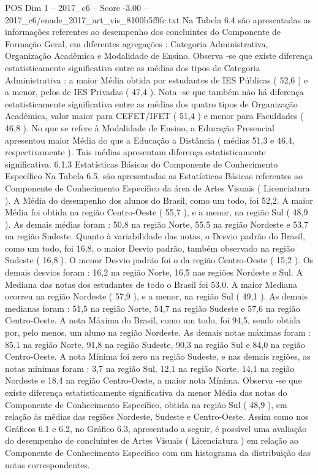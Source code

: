 \begin{textsample}{POS Dim 1 – 2017\_c6 – Score -3.00 – 2017\_c6/enade\_2017\_art\_vis\_8100b5f9fc.txt}
Na Tabela 6.4 são apresentadas as informações referentes ao desempenho dos concluintes do Componente de Formação Geral, em diferentes agregações : Categoria Administrativa, Organização Acadêmica e Modalidade de Ensino.
Observa -se que existe diferença estatisticamente significativa entre as médias dos tipos de Categoria Administrativa : a maior Média obtida por estudantes de IES Públicas ( 52,6 ) e a menor, pelos de IES Privadas ( 47,4 ).
Nota -se que também não há diferença estatisticamente significativa entre as médias dos quatro tipos de Organização Acadêmica, valor maior para CEFET/IFET ( 51,4 ) e menor para Faculdades ( 46,8 ).
No que se refere à Modalidade de Ensino, a Educação Presencial apresentou maior Média do que a Educação a Distância ( médias 51,3 e 46,4, respectivamente ).
Tais médias apresentam diferença estatisticamente significativa. 6.1.3 Estatísticas Básicas do Componente de Conhecimento Específico Na Tabela 6.5, são apresentadas as Estatísticas Básicas referentes ao Componente de Conhecimento Específico da área de Artes Visuais ( Licenciatura ).
A Média do desempenho dos alunos do Brasil, como um todo, foi 52,2.
A maior Média foi obtida na região Centro-Oeste ( 55,7 ), e a menor, na região Sul ( 48,9 ).
As demais médias foram : 50,8 na região Norte, 55,5 na região Nordeste e 53,7 na região Sudeste.
Quanto à variabilidade das notas, o Desvio padrão do Brasil, como um todo, foi 16,8, o maior Desvio padrão, também observado na região Sudeste ( 16,8 ).
O menor Desvio padrão foi o da região Centro-Oeste ( 15,2 ).
Os demais desvios foram : 16,2 na região Norte, 16,5 nas regiões Nordeste e Sul.
A Mediana das notas dos estudantes de todo o Brasil foi 53,0.
A maior Mediana ocorreu na região Nordeste ( 57,9 ), e a menor, na região Sul ( 49,1 ).
As demais medianas foram : 51,5 na região Norte, 54,7 na região Sudeste e 57,6 na região Centro-Oeste.
A nota Máxima do Brasil, como um todo, foi 94,5, sendo obtida por, pelo menos, um aluno na região Nordeste.
As demais notas máximas foram : 85,1 na região Norte, 91,8 na região Sudeste, 90,3 na região Sul e 84,0 na região Centro-Oeste.
A nota Mínima foi zero na região Sudeste, e nas demais regiões, as notas mínimas foram : 3,7 na região Sul, 12,1 na região Norte, 14,1 na região Nordeste e 18,4 na região Centro-Oeste, a maior nota Mínima.
Observa -se que existe diferença estatisticamente significativa da menor Média das notas do Componente de Conhecimento Específico, obtida na região Sul ( 48,9 ), em relação às médias das regiões Nordeste, Sudeste e Centro-Oeste.
Assim como nos Gráficos 6.1 e 6.2, no Gráfico 6.3, apresentado a seguir, é possível uma avaliação do desempenho de concluintes de Artes Visuais ( Licenciatura ) em relação ao Componente de Conhecimento Específico com um histograma da distribuição das notas correspondentes.

\end{textsample}

